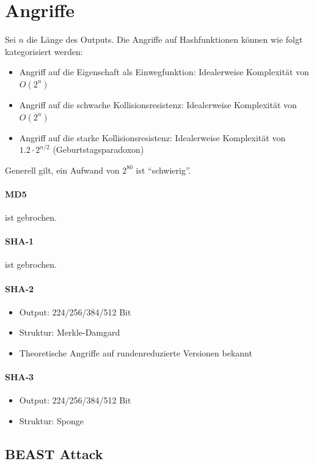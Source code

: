 \section{Angriffe}

Sei $n$ die Länge des Outputs. Die Angriffe auf Hashfunktionen können wie folgt kategorisiert werden:

\begin{itemize}
    \item Angriff auf die Eigenschaft als Einwegfunktion: Idealerweise Komplexität von $O(2^n)$
    \item Angriff auf die schwache Kollisionsresistenz: Idealerweise Komplexität von $O(2^n)$ 
    \item Angriff auf die starke Kollisionsresistenz: Idealerweise Komplexität von $1.2\cdot 2^{n/2}$ (Geburtstagsparadoxon)
\end{itemize}

Generell gilt, ein Aufwand von $2^{80}$ ist ``schwierig''.

\paragraph{MD5} ist gebrochen.
\paragraph{SHA-1} ist gebrochen.
\paragraph{SHA-2} 

\begin{itemize}
    \item Output: 224/256/384/512 Bit
    \item Struktur: Merkle-Damgard
    \item Theoretische Angriffe auf rundenreduzierte Versionen bekannt
\end{itemize}

\paragraph{SHA-3}

\begin{itemize}
    \item Output: 224/256/384/512 Bit
    \item Struktur: Sponge
\end{itemize}

\subsection{BEAST Attack}

